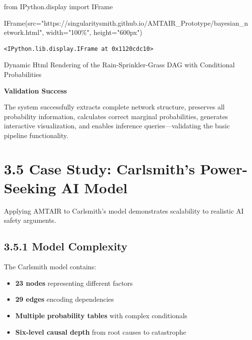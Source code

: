 \documentclass[
  11pt,
  letterpaper,
]{book}
\newenvironment{Shaded}{\begin{snugshade}}{\end{snugshade}}
\newcommand{\ImportTok}[1]{\textcolor[rgb]{0.00,0.46,0.62}{#1}}
\newcommand{\NormalTok}[1]{\textcolor[rgb]{0.00,0.23,0.31}{#1}}
\newcommand{\OperatorTok}[1]{\textcolor[rgb]{0.37,0.37,0.37}{#1}}
\newcommand{\StringTok}[1]{\textcolor[rgb]{0.13,0.47,0.30}{#1}}
\providecommand{\tightlist}{%
  \setlength{\itemsep}{0pt}\setlength{\parskip}{0pt}}
\begin{document}
\begin{landscape}
\begin{Shaded}
\begin{Highlighting}[]
\ImportTok{from}\NormalTok{ IPython.display }\ImportTok{import}\NormalTok{ IFrame}

\NormalTok{IFrame(src}\OperatorTok{=}\StringTok{"https://singularitysmith.github.io/AMTAIR\_Prototype/bayesian\_network.html"}\NormalTok{, width}\OperatorTok{=}\StringTok{"100\%"}\NormalTok{, height}\OperatorTok{=}\StringTok{"600px"}\NormalTok{)}
\end{Highlighting}
\end{Shaded}

\label{rain_sprinkler_grass_example_network_rendering2}
\begin{verbatim}
<IPython.lib.display.IFrame at 0x1120cdc10>
\end{verbatim}

Dynamic Html Rendering of the Rain-Sprinkler-Grass DAG with Conditional
Probabilities

\textbf{Validation Success}

The system successfully extracts complete network structure, preserves
all probability information, calculates correct marginal probabilities,
generates interactive visualization, and enables inference
queries---validating the basic pipeline functionality.

\section*{3.5 Case Study: Carlsmith's Power-Seeking AI
Model}\label{sec-case-carlsmith}


Applying AMTAIR to Carlsmith's model demonstrates scalability to
realistic AI safety arguments.

\subsection*{3.5.1 Model Complexity}\label{sec-carlsmith-complexity}

The Carlsmith model contains:

\begin{itemize}
\tightlist
\item
  \textbf{23 nodes} representing different factors
\item
  \textbf{29 edges} encoding dependencies
\item
  \textbf{Multiple probability tables} with complex conditionals
\item
  \textbf{Six-level causal depth} from root causes to catastrophe
\end{itemize}


\end{landscape}
\end{document}
